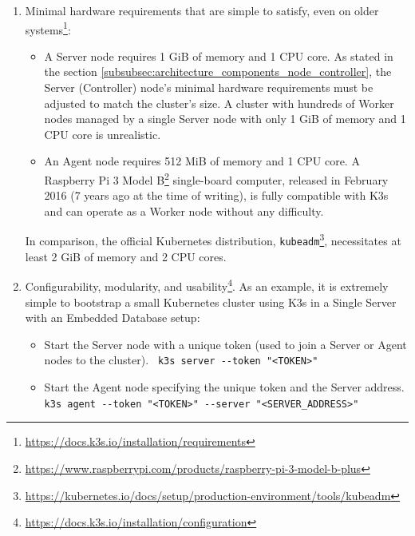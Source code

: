 \begin{enumerate}
  \item Minimal hardware requirements that are simple to satisfy, even on older
    systems\footnote{\url{https://docs.k3s.io/installation/requirements}}:
    \begin{itemize}
      \item A Server node requires 1 GiB of memory and 1 CPU core.
        \newline
        As stated in the section
        \ref{subsubsec:architecture_components_node_controller}, the Server (Controller)
        node's minimal hardware requirements must be adjusted to match the cluster's
        size. A cluster with hundreds of Worker nodes managed by a single Server
        node with only 1 GiB of memory and 1 CPU core is unrealistic.

      \item An Agent node requires 512 MiB of memory and 1 CPU core.
        \newline
        A Raspberry Pi 3 Model B\footnote{\url{https://www.raspberrypi.com/products/raspberry-pi-3-model-b-plus}}
        single-board computer, released in February 2016 (7 years ago at the
        time of writing), is fully compatible with K3s and can operate as a
        Worker node without any difficulty.
    \end{itemize}
    In comparison, the official Kubernetes distribution, \texttt{kubeadm}\footnote{\url{https://kubernetes.io/docs/setup/production-environment/tools/kubeadm}},
    necessitates at least 2 GiB of memory and 2 CPU cores.

  \item Configurability, modularity, and usability\footnote{\url{https://docs.k3s.io/installation/configuration}}.
    \newline
    As an example, it is extremely simple to bootstrap a small Kubernetes cluster
    using K3s in a Single Server with an Embedded Database setup:
    \begin{itemize}
      \item Start the Server node with a unique token (used to join a Server or
        Agent nodes to the cluster).
        \newline
        \lstinline[language=shell, alsoletter={-}, morekeywords={[2]{k3s}}, morekeywords={[3]{--token}},
        morekeywords={[4]{server}}, xleftmargin=\parindent]{ k3s server --token "<TOKEN>"}

      \item Start the Agent node specifying the unique token and the Server address.
        \newline
        \lstinline[language=shell, alsoletter={-}, morekeywords={[2]{k3s}}, morekeywords={[3]{--token, --server}},
        morekeywords={[4]{agent}}, xleftmargin=\parindent]{ k3s agent --token "<TOKEN>" --server "<SERVER_ADDRESS>"}
    \end{itemize}


\end{enumerate}
